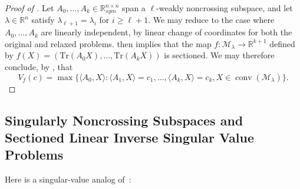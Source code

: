 \documentclass{article}
\numberwithin{equation}{section}
\newcommand{\tr}{\mathrm{Tr}}
\newcommand{\R}{\mathbb{R}}
\DeclareMathOperator*{\conv}{conv}
\newcommand{\cM}{{\mathcal{M}}}
\begin{document}
\begin{proof}[Proof of ]
    Let $A_0, \dots, A_k \in \R^{n \times n}_{sym}$ span a $\ell$-weakly noncrossing subspace, and let $\lambda \in \R^n$ satisfy $\lambda_{\ell+1} = \lambda_i$ for $i \ge \ell+1$.
    We may reduce to the case where $A_0, \dots, A_{k}$ are linearly independent, by linear change of coordinates for both the original and relaxed problems.
     then implies that the map $f : \cM_{\lambda} \rightarrow \R^{k+1}$ defined by $f(X) = (\tr(A_0X), \dots, \tr(A_{k}X))$ is sectioned.
    We may therefore conclude, by , that 
    \[
    V_f(c) = \max \{\langle A_0, X\rangle : \langle A_1, X\rangle = c_1, \dots, \langle A_{k}, X\rangle = c_{k}, X \in \conv(\cM_{\lambda})\}.
    \]
\end{proof}

\subsection{Singularly Noncrossing Subspaces and Sectioned Linear Inverse Singular Value Problems}
\label{subsec:lisv}
Here is a singular-value analog of~:
\end{document}
